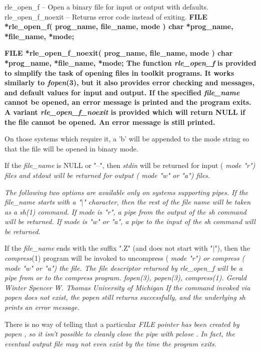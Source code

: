 rle\_open\_f -- Open a binary file for input or output with defaults.
\nwl
rle\_open\_f\_noexit -- Returns error code instead of exiting.
\bf
FILE *rle\_open\_f( prog\_name, file\_name, mode )
\nwl
\bf
char *prog\_name, *file\_name, *mode;
\par\vspace{1.0\baselineskip}
\bf
FILE *rle\_open\_f\_noexit( prog\_name, file\_name, mode )
\nwl
\bf
char *prog\_name, *file\_name, *mode;
The function
{\it rle\_open\_f}
is provided to simplify the task of opening files in toolkit programs.
It works similarly to 
{\it fopen}{\rm (3),}
but it also provides error checking and messages, and default values
for input and output.  If the specified 
{\it file\_name}
cannot be opened, an error message is printed and the program exits.
A variant
{\it rle\_open\_f\_noexit}
is provided which will return NULL if the file cannot be opened.  An
error message is still printed.

On those systems which require it, a 'b' will be appended to the mode
string so that the file will be opened in binary mode.

If the 
{\it file\_name}
is NULL or "--", then 
{\it stdin}
will be returned for input (%
\it mode %
\rm "r") files and
{\it stdout}
will be returned for output (%
\it mode %
\rm "w" or "a") files.  

\it
The following two options are available only on systems supporting pipes.
If the 
{\it file\_name}
starts with a "$|$" character, then the rest of the file name will be
taken as a 
{\it sh}{\rm (1)}
command.  If 
{\it mode}
is "r", a pipe from the output of the
{\it sh}
command will be returned.  If
{\it mode}
is "w" or "a", a pipe to the input of the
{\it sh}
command will be returned.

If the
{\it file\_name}
ends with the suffix ".Z" (and does not start with "$|$"), then the 
{\it compress}{\rm (1)}
program will be invoked to uncompress (%
\it mode %
\rm "r") or compress
(%
\it mode %
\rm "w" or "a") the file.  The file descriptor returned by
{\it rle\_open\_f}
will be a pipe from or to the compress program.
{\it fopen}{\rm (3),}
{\it popen}{\rm (3),}
{\it compress}{\rm (1).}
Gerald Winter
\nwl
Spencer W. Thomas
\nwl
University of Michigan
If the command invoked via %
\it popen %
\rm does not exist, the %
\it popen %
\rm still returns successfully, and the underlying %
\it sh %
\rm prints an
error message.
 
There is no way of telling that a particular %
\it FILE \rm%
pointer has
been created by %
\it popen\rm%
, so it isn't possible to cleanly close the
pipe with %
\it pclose\rm%
.  In fact, the eventual output file may not
even exist by the time the program exits.
\newpage


